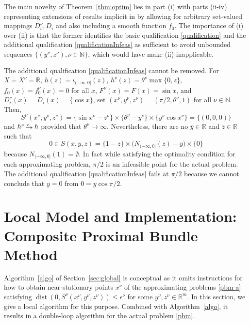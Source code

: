 \documentclass[smallextended,envcountsect]{svjour3}
\newcommand{\ind}{\iota}%
\renewcommand{\Re}{\mathbb{R}}
\newcommand{\nats}{\mathbb{N}}
\newcommand{\reals}{\mathbb{R}}
\DeclareMathOperator{\dist}{dist}
\newcommand{\eto}{\,{\lower 1pt\hbox{$\rightarrow$}}\kern -10pt
     \hbox{\raise 4pt \hbox{$\, \scriptstyle e$}}\hskip7pt}
\begin{document}
The main novelty of Theorem~\ref{thm:optim} lies in part (i) with parts (ii-iv) representing extensions of results implicit in \cite{Royset2023a} by allowing for arbitrary set-valued mappings $D_i^\nu, D_i$ and also including a smooth function $f_0$. The importance of (i) over (ii) is that the former identifies the basic qualification \eqref{qualification} and the additional qualification \eqref{qualificationInfeas} as sufficient to avoid unbounded sequences $\{(y^\nu,z^\nu), \nu\in\nats\}$, which would have make (ii) inapplicable.  

The additional qualification \eqref{qualificationInfeas} cannot be removed. For $X = X^\nu = \reals$, $h(z) = \ind_{(-\infty,0]}(z)$, $h^\nu(z) = \theta^\nu \max\{0, z\}$, $f_0(x) = f_0^\nu(x) = 0$ for all $x$, $F^\nu(x) = F(x) = \sin x$, and $D_i^\nu(x) = D_i(x) = \{\cos x\}$, set $(x^\nu, y^\nu, z^\nu) = (\pi/2, \theta^\nu, 1)$ for all $\nu\in\nats$. Then, 
\[
S^\nu(x^\nu,y^\nu,z^\nu) = \{\sin x^\nu - z^\nu\} \times \{\theta^\nu - y^\nu\} \times \{y^\nu \cos x^\nu\}  = \{(0,0,0)\}
\]
and $h^\nu \eto h$ provided that $\theta^\nu\to \infty$. Nevertheless, there are no $\bar y\in\reals$ and $\bar z\in \reals$ such that   
\[
0 \in S(\bar x,\bar y, \bar z) = \{1 - \bar z\} \times \big(N_{(-\infty,0]}(\bar z) - \bar y\big) \times \{0\}  
\]
because $N_{(-\infty,0]}(1) = \emptyset$. In fact while satisfying the optimality condition for each approximating problem, $\pi/2$ is an infeasible point for the actual problem. The additional qualification \eqref{qualificationInfeas} fails at $\pi/2$ because we cannot conclude that $y = 0$ from $0 = y \cos \pi/2$.  



\section{Local Model and Implementation: Composite Proximal Bundle Method}\label{sec:bundle}

Algorithm~\ref{algo} of Section~\ref{sec:global} is conceptual as it omits instructions for how to obtain near-stationary points $x^\nu$ of the approximating problems \eqref{pbm-a} satisfying $\dist(0,S^\nu(x^\nu,y^\nu,z^\nu))\leq \epsilon^\nu$ for some $y^\nu,z^\nu\in \Re^m$. In this section, we give a local algorithm for this purpose. Combined with Algorithm~\ref{algo}, it results in a double-loop algorithm for the actual problem \eqref{pbm}.
\end{document}

